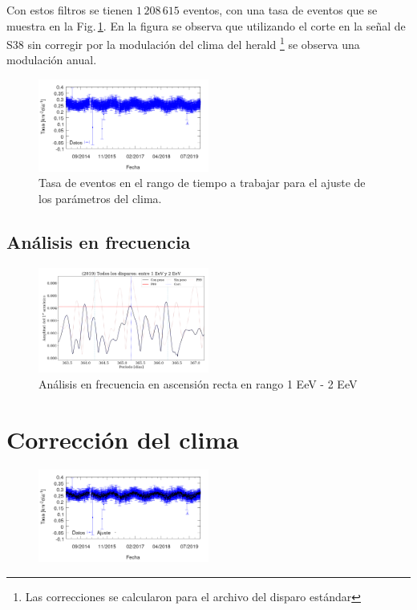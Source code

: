 Con estos filtros se tienen $1\,208\,615$ eventos, con una tasa de eventos que se muestra en la Fig.\,\ref{tasa_total_diaria_ajuste_weather}. En la figura se observa que utilizando el corte en la señal de S38 sin corregir por la modulación del clima del herald \footnote{Las correcciones se calcularon para el archivo del disparo estándar} se observa una modulación anual.

\begin{figure}[H]
	\centering
	\includegraphics[width=0.5\textwidth]{rate_total_ajuste_weather.png}
	\caption{Tasa  de eventos en el rango de tiempo a trabajar para el ajuste de los parámetros del clima.}
	\label{tasa_total_diaria_ajuste_weather}
\end{figure}


\subsection{Análisis en frecuencia}

\begin{figure}[H]
	\centering
	\includegraphics[width=0.5\textwidth]{2019_AllTriggers_1_2_EeV_con_vs_sin_peso.png}
	\caption{Análisis en frecuencia en ascensión recta en rango 1 EeV - 2 EeV}
	\label{fig:consin}
\end{figure}


\section{Corrección del clima}

\begin{figure}[H]
	\centering
	\includegraphics[width=0.5\textwidth]{rate_Ajuste.png}
\end{figure}



